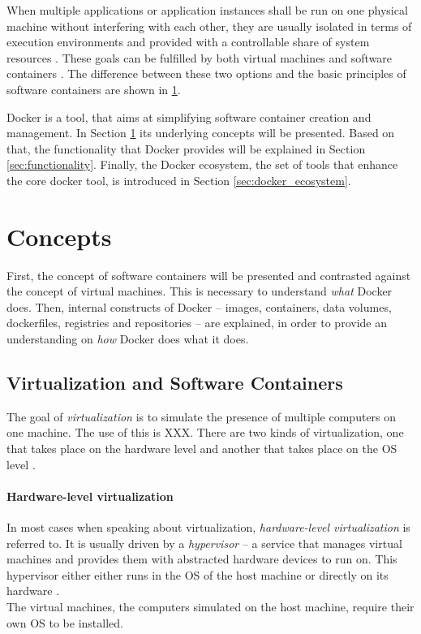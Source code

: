   When multiple applications or application instances shall be run on one physical machine without interfering with each other, they are usually isolated in terms of execution environments and provided with a controllable share of system resources \cite{Felter2014Updated}. These goals can be fulfilled by both virtual machines and software containers \cite{Ruiz2015Performance}. The difference between these two options and the basic principles of software containers are shown in \ref{sec:docker_concepts}.

  Docker is a tool, that aims at simplifying software container creation and management. In Section \ref{sec:docker_concepts} its underlying concepts will be presented. Based on that, the functionality that Docker provides will be explained in Section \ref{sec:functionality}. Finally, the Docker ecosystem, \ie the set of tools that enhance the core docker tool, is introduced in Section \ref{sec:docker_ecosystem}.

\section{Concepts} %
\label{sec:docker_concepts}

  First, the concept of software containers will be presented and contrasted against the concept of virtual machines. This is necessary to understand \emph{what} Docker does. Then, internal constructs of Docker -- images, containers, data volumes, dockerfiles, registries and repositories -- are explained, in order to provide an understanding on \emph{how} Docker does what it does.

  \subsection{Virtualization and Software Containers} %
  \label{sub:virtualization_and_software_containers}
    The goal of \emph{virtualization} is to simulate the presence of multiple computers on one machine. The use of this is XXX. There are two kinds of virtualization, one that takes place on the hardware level and another that takes place on the \ac{OS} level \cite{Ruiz2015Performance}.

    \paragraph{Hardware-level virtualization} %
    \label{par:hardware_level_virtualization}
      In most cases when speaking about virtualization, \emph{hardware-level virtualization} is referred to. It is usually driven by a \emph{hypervisor} -- a service that manages virtual machines and provides them with abstracted hardware devices to run on. This hypervisor either either runs in the OS of the host machine or directly on its hardware \cite{Ruiz2015Performance}. \\
      The virtual machines, \ie the computers simulated on the host machine, require their own OS to be installed.

